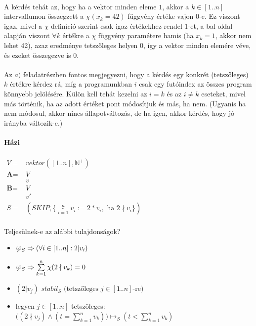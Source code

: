 \documentclass[12pt]{article}
\newcommand{\doboz}[2]{ \ensuremath{\mathop{\square}\limits_{#1=1}^{#2} }  }
\newcommand{\fixpont}{\ensuremath{\mathlarger{\mathlarger{\varphi}}_S}}
\begin{document}
	\paragraph{}A kérdés tehát az, hogy ha a vektor minden eleme $1$, akkor a $k \in [1..n]$ intervallumon összegzett a $\chi(x_k=42)$ függvény értéke vajon $0$-e. Ez viszont igaz, mivel a $\chi$ definíció szerint csak igaz értékekhez rendel $1$-et, a bal oldal alapján viszont $\forall k$ értékre a $\chi$ függvény paramétere hamis (ha $x_k=1$, akkor nem lehet 42), azaz eredménye tetszőleges helyen $0$, így a vektor minden elemére véve, és ezeket összegezve is 0.

	\paragraph{}
	Az $a)$ feladatrészben fontos megjegyezni, hogy a kérdés egy konkrét (tetszőleges) $k$ értékre kérdez rá, míg a programunkban $i$ csak egy futóindex az összes program könnyebb jelölésére. Külön kell tehát kezelni az $i=k$ és az $i\ne k$ eseteket, mivel más történik, ha az adott értéket pont módosítjuk és más, ha nem. (Ugyanis ha nem módosul, akkor nincs állapotváltozás, de ha igen, akkor kérdés, hogy jó irányba változik-e.)
		
	\paragraph{Házi}
	\paragraph{}
	$
	\begin{aligned}
	V = &vektor([1..n], \mathbb{N}^+)\\
	\textbf{A} = &V\\
	&v\\
	\textbf{B} = &V\\
	&v'\\
	S = &(SKIP,\{\doboz{i}{n} v_i := 2*v_i, \text{ ha } 2 \nmid v_i \})
	\end{aligned}
	$
	\paragraph{}
	Teljesülnek-e az alábbi tulajdonságok?
	\begin{itemize}
		\item $ \fixpont \Rightarrow (\forall i \in [1..n]: 2 | v_i)$
		\item $ \fixpont \Rightarrow \sum\limits_{k=1}^{n}\chi(2 \nmid v_k) = 0$
		\item $(2|v_j) \textit{ stabil}_S \text{ (tetszőleges } j \in [1..n]\text{-re})$
		\item legyen $j \in [1..n]$ tetszőleges: $\big( (2\nmid v_j) \land (t= \sum\limits_{k=1}^{n} v_k)\big) \mapsto_S (t < \sum\limits_{k=1}^{n}v_k) $
	\end{itemize}
	
\end{document}
